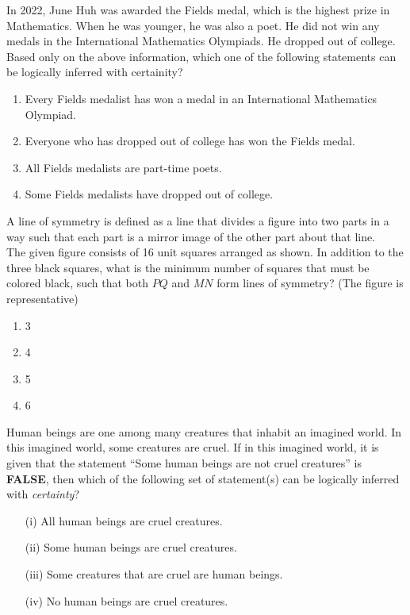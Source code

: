  \item In 2022, June Huh was awarded the Fields medal, which is the highest prize in
Mathematics.
When he was younger, he was also a poet. He did not win any medals in the
International Mathematics Olympiads. He dropped out of college.
Based only on the above information, which one of the following statements can be logically inferred with certainity?
\begin{enumerate}
 \item Every Fields medalist has won a medal in an International Mathematics Olympiad.
\item Everyone who has dropped out of college has won the Fields medal.
\item All Fields medalists are part-time poets.
\item Some Fields medalists have dropped out of college.
\end{enumerate}
\item A line of symmetry is defined as a line that divides a figure into two parts in a way such that each part is a mirror image of the other part about that line. \\
The given figure consists of 16 unit squares arranged as shown. In addition to the three black squares, what is the minimum number of squares that must be colored black, such that both $PQ$ and $MN$ form lines of symmetry? (The figure is representative)

\begin{enumerate}
    \item 3
    \item 4
    \item 5
    \item 6
\end{enumerate}
\item Human beings are one among many creatures that inhabit an imagined world. In this imagined world, some creatures are cruel. If in this imagined world, it is given that the statement ``Some human beings are not cruel creatures'' is \textbf{FALSE}, then which of the following set of statement(s) can be logically inferred with \textit{certainty}?
  \begin{enumerate}
    \item[(i)] All human beings are cruel creatures.
    \item[(ii)] Some human beings are cruel creatures.
    \item[(iii)] Some creatures that are cruel are human beings.
    \item[(iv)] No human beings are cruel creatures.
  \end{enumerate}

